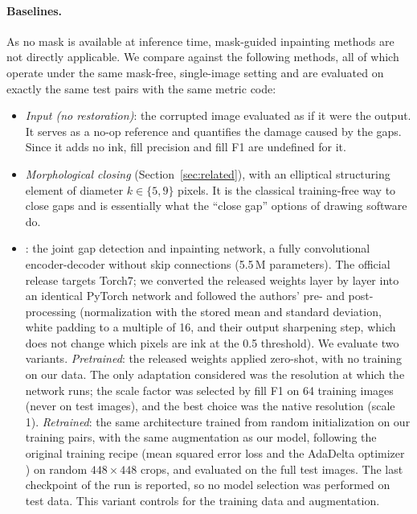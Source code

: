 \documentclass[preprint,12pt]{elsarticle}
\begin{document}
\paragraph{Baselines.} As no mask is available at inference time, mask-guided
inpainting methods are not directly applicable. We compare against the following
methods, all of which operate under the same mask-free, single-image setting and are
evaluated on exactly the same test pairs with the same metric code:
\begin{itemize}
\item \emph{Input (no restoration)}: the corrupted image evaluated as if it were the
  output. It serves as a no-op reference and quantifies the damage caused by the gaps. Since it
  adds no ink, fill precision and fill F1 are undefined for it.
\item \emph{Morphological closing} \citep{serra1982morphology,soille2003morphological}
  (Section~\ref{sec:related}), with an elliptical structuring element of diameter
  $k \in \{5, 9\}$ pixels. It is the classical training-free way to close gaps and
  is essentially what the ``close gap'' options of drawing software do.
\item \emph{\citet{sasaki2017joint}}: the joint gap detection and
  inpainting network, a fully convolutional encoder-decoder without skip connections
  (5.5\,M parameters). The official release targets Torch7; we converted the released
  weights layer by layer into an identical PyTorch network and followed the authors'
  pre- and post-processing (normalization with the stored mean and standard deviation,
  white padding to a multiple of 16, and their output sharpening step, which does not
  change which pixels are ink at the 0.5 threshold). We evaluate two variants.
  \emph{Pretrained}: the released weights applied zero-shot, with no training on our
  data. The only adaptation considered was the resolution at which the network runs;
  the scale factor was selected by fill F1 on 64 training images (never on test
  images), and the best choice was the native resolution (scale 1). \emph{Retrained}:
  the same architecture trained from random initialization on our training pairs, with
  the same augmentation as our model, following the original training recipe (mean
  squared error loss and the AdaDelta optimizer \citep{zeiler2012adadelta}) on random
  $448\times 448$ crops, and evaluated on the full test images. The last checkpoint of
  the run is reported, so no model selection was performed on test data. This variant controls for the training data and augmentation.
\end{itemize}
\end{document}
